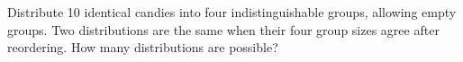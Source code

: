 Distribute 10 identical candies into four indistinguishable groups, allowing empty groups. Two distributions are the same when their four group sizes agree after reordering. How many distributions are possible?

